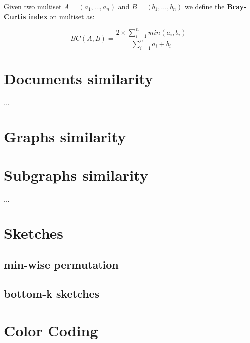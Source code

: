 \begin{definizione}\label{def:wbray}
    Given two multiset $A = (a_{1}, \ldots, a_{n}) $ and $B = (b_{1}, \ldots, b_{n})$ we define the \textbf{Bray-Curtis index} on multiset as:
    
    \begin{equation}
    BC(A,B) = \frac{ 2 \times \sum\limits_{i=1}^n { min(a_{i}, b_{i}) } }{\sum\limits_{i=1}^n {a_{i} + b_{i}}}
    \end{equation}
    
\end{definizione}


\section{Documents similarity}

...

\section{Graphs similarity}

\section{Subgraphs similarity}

...

\section{Sketches}

\subsection{min-wise permutation}
\subsection{bottom-k sketches}

\section{Color Coding}
